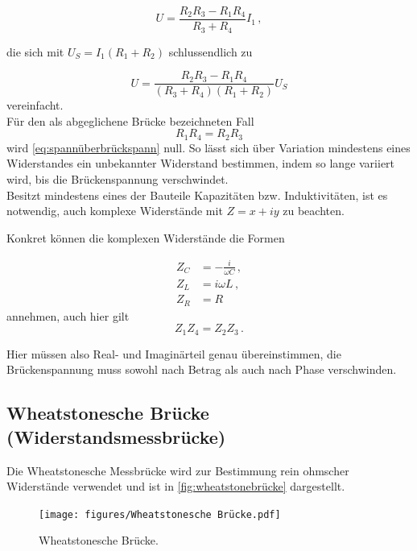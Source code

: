 \begin{equation*}
    U = \frac{R_2 R_3 - R_1 R_4}{R_3 + R_4} I_1 \,,
    \label{eq:spannungglei4}
\end{equation*}

die sich mit $U_S = I_1 (R_1 + R_2)$ schlussendlich zu 

\begin{equation}
    U = \frac{R_2 R_3 - R_1 R_4}{(R_3 + R_4)(R_1 + R_2)} U_S
    \label{eq:spannüberbrückspann}
\end{equation} vereinfacht. \\

Für den als abgeglichene Brücke bezeichneten Fall 
\begin{equation}
    R_1 R_4 = R_2 R_3
    \label{eq:abgleichbed}
\end{equation} wird \eqref{eq:spannüberbrückspann} null. 
So lässt sich über Variation mindestens eines Widerstandes ein unbekannter Widerstand bestimmen, indem so lange variiert wird, bis die Brückenspannung verschwindet.\\

Besitzt mindestens eines der Bauteile Kapazitäten bzw. Induktivitäten, ist es notwendig, auch komplexe Widerstände mit $Z = x + iy$ zu beachten.

Konkret können die komplexen Widerstände die Formen

\begin{align}
    \nonumber
    Z_C & = -\frac{i}{ω C} \,, \\
    \nonumber
    Z_L & = i ω L  \,, \\
    \nonumber
    Z_R & = R  
\end{align} 
annehmen, auch hier gilt
\begin{equation*}
    Z_1 Z_4 = Z_2 Z_3 \,.
\end{equation*} 

Hier müssen also Real- und Imaginärteil genau übereinstimmen, die Brückenspannung muss sowohl nach Betrag als auch nach Phase verschwinden.


\subsection{Wheatstonesche Brücke (Widerstandsmessbrücke)}
\label{subsec:wheatstone}

Die Wheatstonesche Messbrücke wird zur Bestimmung rein ohmscher Widerstände verwendet und ist in \autoref{fig:wheatstonebrücke} dargestellt.

\begin{figure}[H]
    \centering
    \texttt{[image: figures/Wheatstonesche Brücke.pdf]}
    \caption{Wheatstonesche Brücke\cite{ap07}.}
    \label{fig:wheatstonebrücke}
\end{figure}

